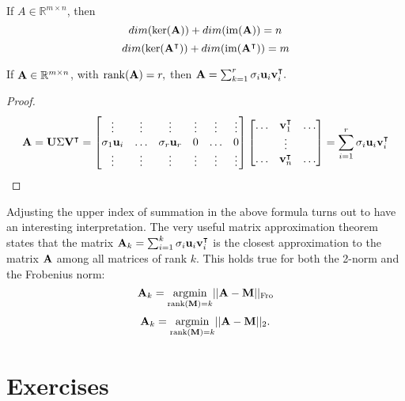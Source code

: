 \begin{corollary}
If $A \in \mathbb R^{m \times n}$, then 
$$dim(\kernel(\MA)) + dim(\image(\MA)) = n$$
$$dim(\kernel(\MA^\intercal)) + dim(\image(\MA^\intercal)) = m$$
\end{corollary}

\begin{proposition}
If $\MA \in \mathbb R^{m \times n}$, with $\rank(\MA) = r,$ then $\MA = \sum_{k = 1}^r \sigma_i \vu_i \vv_i^\intercal.$ 
\end{proposition}
\begin{proof}
$$\MA = \MU \Sigma  \MV^\intercal = \begin{bmatrix}
\vdots & \vdots & \vdots & \vdots & \vdots & \vdots \\
\sigma_1 \vu_i  & \ldots & \sigma_r \vu_r & 0 & \ldots & 0 \\
\vdots & \vdots & \vdots & \vdots & \vdots & \vdots
\end{bmatrix} \begin{bmatrix}
\ldots & \vv_1^\intercal & \ldots \\
& \vdots & \\
\ldots & \vv_n^\intercal & \ldots 
\end{bmatrix} = \sum_{i =1}^r \sigma_i \vu_i \vv_i^\intercal$$
\end{proof}

Adjusting the upper index of summation in the above formula turns out to have an interesting interpretation. The very useful matrix approximation theorem states that the matrix $\MA_k = \sum_{i=1}^k\sigma_i\vu_i\vv_i^\intercal$ is the closest approximation to the matrix $\MA$ among all matrices of rank $k$. This holds true for both the 2-norm and the Frobenius norm:
$$\MA_k = \underset{\rank(\MM) = k}{\argmin}||\MA - \MM||_\Fro$$
$$\MA_k = \underset{\rank(\MM) = k}{\argmin}||\MA - \MM||_2.$$
 
\section{Exercises}

